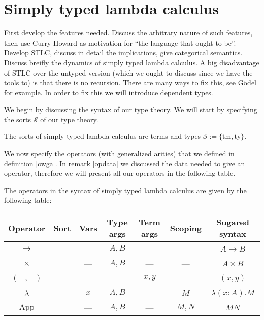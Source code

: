 \newcommand{\tm}{\mathrm{tm}}
\newcommand{\ty}{\mathrm{ty}}

%
%
\section{Simply typed lambda calculus} 


First develop the features needed. Discuss the arbitrary nature of such features, then use Curry-Howard as motivation for ``the language that ought to be''. Develop STLC, discuss in detail the implications, give categorical semantics. Discuss breifly the dynamics of simply typed lambda calculus. A big disadvantage of STLC over the untyped version (which we ought to discuss since we have the tools to) is that there is no recursion. There are many ways to fix this, see G\"odel for example. In order to fix this we will introduce dependent types.

We begin by discussing the syntax of our type theory. We will start by specifying the sorts $\mathcal{S}$ of our type theory.

\begin{defin}
    The sorts of simply typed lambda calculus are terms and types $\mathcal{S} := \{ \tm , \ty\}$.
\end{defin}

We now specify the operators (with generalized arities) that we defined in definition \ref{owga}. In remark \ref{opdata} we discussed the data needed to give an operator, therefore we will present all our operators in the following table.

\begin{defin}
    The operators in the syntax of simply typed lambda calculus are given by the following table:
    \begin{center}
        \begin{tabular}{ c|c|c|c|c|c|c }
        Operator & Sort & Vars & Type args & Term args & Scoping & Sugared syntax \\
        \hline
        $\to$           & \ty &  --- & $A,B$ &  ---  &  ---  & $A \to B$       \\
        $\times$        & \ty &  --- & $A,B$ &  ---  &  ---  & $A \times B$    \\
        $(-,-)$         & \tm &  --- &  ---  & $x,y$ &  ---  & $(x,y)$  \\
        $\lambda$       & \tm &  $x$ & $A,B$ &  ---  & $M$   & $\lambda (x : A).M$ \\
        $\mathrm{App}$  & \tm &  --- & $A,B$ &  ---  & $M,N$ & $M N$
        \end{tabular}
    \end{center}
\end{defin}

